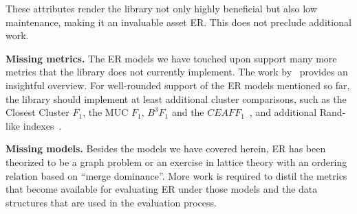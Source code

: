\documentclass[a4paper,twoside]{article}
\begin{document}
    These attributes render the library not only highly beneficial but also low
    maintenance, making it an invaluable asset ER.\@
    This does not preclude additional work.

    \textbf{Missing metrics.}
    The ER models we have touched upon support many more metrics that the
    library does not currently implement.
    The work by~\cite{hitesh2012} provides an insightful overview.
    For well-rounded support of the ER models mentioned so far, the library
    should implement at least additional cluster comparisons, such as the
    Closest Cluster $F_1$, the MUC $F_1$, $B^3 F_1$ and the
    $CEAF F_1$~\cite{hitesh2012}, and additional Rand-like indexes~\cite{warrens2022understanding}.

    \textbf{Missing models.} 
    Besides the models we have covered herein, ER has been
    theorized to be a graph problem\cite{eager2021} or an exercise in lattice
    theory with an ordering relation based on
    ``merge dominance''\cite{Ben2009Swoosh}.
    More work is required to distil the metrics that become available for
    evaluating ER under those models and the data structures that are used in
    the evaluation process.

    
    {
        \small
        
    }
\end{document}
